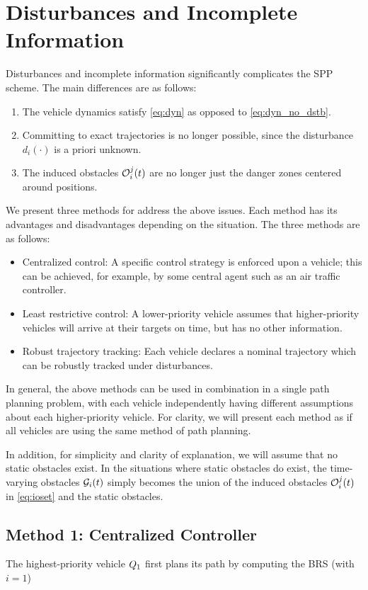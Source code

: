 \section{Disturbances and Incomplete Information \label{sec:obs_gen}}
Disturbances and incomplete information significantly complicates the SPP scheme. The main differences are as follows:

\begin{enumerate}
\item The vehicle dynamics satisfy \eqref{eq:dyn} as opposed to \eqref{eq:dyn_no_dstb}.
\item Committing to exact trajectories is no longer possible, since the disturbance $d_i(\cdot)$ is a priori unknown.
\item The induced obstacles $\mathcal{O}_i^j(t)$ are no longer just the danger zones centered around positions.
\end{enumerate}

We present three methods for address the above issues. Each method has its advantages and disadvantages depending on the situation. The three methods are as follows:
\begin{itemize}
\item Centralized control: A specific control strategy is enforced upon a vehicle; this can be achieved, for example, by some central agent such as an air traffic controller.
\item Least restrictive control: A lower-priority vehicle assumes that higher-priority vehicles will arrive at their targets on time, but has no other information.
\item Robust trajectory tracking: Each vehicle declares a nominal trajectory which can be robustly tracked under disturbances.
\end{itemize}

In general, the above methods can be used in combination in a single path planning problem, with each vehicle independently having different assumptions about each higher-priority vehicle. For clarity, we will present each method as if all vehicles are using the same method of path planning.

In addition, for simplicity and clarity of explanation, we will assume that no static obstacles exist. In the situations where static obstacles do exist, the time-varying obstacles $\mathcal{G}_i(t)$ simply becomes the union of the induced obstacles $\mathcal{O}_i^j(t)$ in \eqref{eq:ioset} and the static obstacles.

\subsection{Method 1: Centralized Controller \label{sec:cc}}
The highest-priority vehicle $Q_1$ first plans its path by computing the BRS (with $i=1$)

